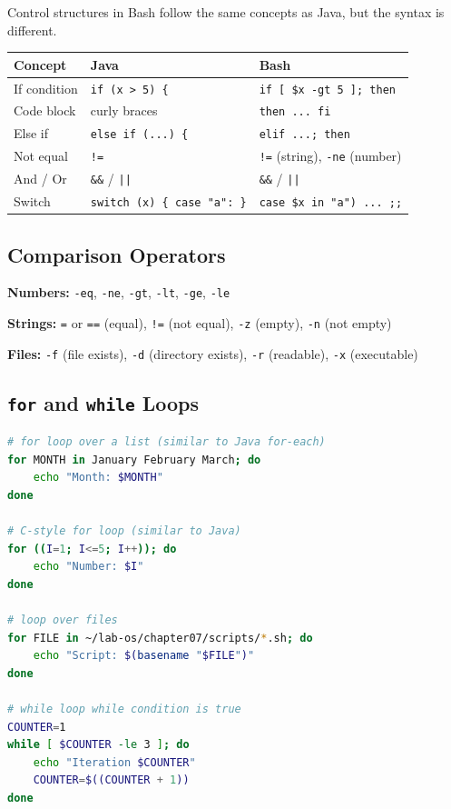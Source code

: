 Control structures in Bash follow the same concepts as Java, but the syntax is
different.

\begin{center}
\begin{tabular}{lll}
\hline
\textbf{Concept} & \textbf{Java} & \textbf{Bash} \\
\hline
If condition & \texttt{if (x > 5) \{} & \texttt{if [ \$x -gt 5 ]; then} \\
Code block & curly braces & \texttt{then ... fi} \\
Else if & \texttt{else if (...) \{} & \texttt{elif ...; then} \\
Not equal & \texttt{!=} & \texttt{!=} (string), \texttt{-ne} (number) \\
And / Or & \texttt{\&\&} / \texttt{||} & \texttt{\&\&} / \texttt{||} \\
Switch & \texttt{switch (x) \{ case "a": \}} & \texttt{case \$x in "a") ... ;;} \\
\hline
\end{tabular}
\end{center}

\subsection*{Comparison Operators}

\textbf{Numbers:} \texttt{-eq}, \texttt{-ne}, \texttt{-gt}, \texttt{-lt},
\texttt{-ge}, \texttt{-le}

\textbf{Strings:} \texttt{=} or \texttt{==} (equal), \texttt{!=} (not
equal), \texttt{-z} (empty), \texttt{-n} (not empty)

\textbf{Files:} \texttt{-f} (file exists), \texttt{-d} (directory exists),
\texttt{-r} (readable), \texttt{-x} (executable)

\subsection*{\texttt{for} and \texttt{while} Loops}

\begin{lstlisting}[language=bash, caption={for and while loops}]
# for loop over a list (similar to Java for-each)
for MONTH in January February March; do
    echo "Month: $MONTH"
done

# C-style for loop (similar to Java)
for ((I=1; I<=5; I++)); do
    echo "Number: $I"
done

# loop over files
for FILE in ~/lab-os/chapter07/scripts/*.sh; do
    echo "Script: $(basename "$FILE")"
done

# while loop while condition is true
COUNTER=1
while [ $COUNTER -le 3 ]; do
    echo "Iteration $COUNTER"
    COUNTER=$((COUNTER + 1))
done
\end{lstlisting}

